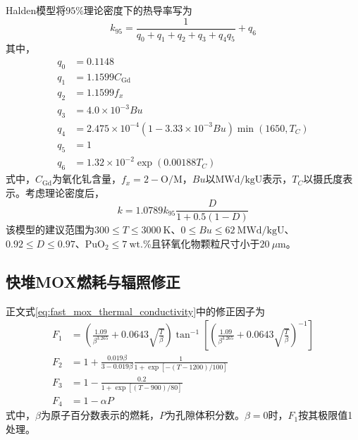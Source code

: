 Halden模型将$95\%$理论密度下的热导率写为
\begin{equation}
	k_{95}=
	\frac{1}{q_0+q_1+q_2+q_3+q_4q_5}+q_6
	\label{eq:appendix_halden_k95}
\end{equation}
其中，
\begin{equation}
	\begin{aligned}
		q_0&=0.1148\\
				q_1&=1.1599C_{\mathrm{Gd}}\\
				q_2&=1.1599f_x\\
				q_3&=4.0\times10^{-3}Bu\\
				q_4&=2.475\times10^{-4}
				\left(1-3.33\times10^{-3}Bu\right)
				\min(1650,T_C)\\
				q_5&=1\\
				q_6&=1.32\times10^{-2}\exp(0.00188T_C)
	\end{aligned}
	\label{eq:appendix_halden_terms}
\end{equation}
\label{eq:appendix_halden_q0}
\label{eq:appendix_halden_q1}
\label{eq:appendix_halden_q2}
\label{eq:appendix_halden_q3}
\label{eq:appendix_halden_q4}
\label{eq:appendix_halden_q5}
\label{eq:appendix_halden_q6}
式中，$C_{\mathrm{Gd}}$为氧化钆含量，$f_x=2-\mathrm{O/M}$，$Bu$以$\mathrm{MWd/kgU}$表示，$T_C$以摄氏度表示。考虑理论密度后，
\begin{equation}
	k=1.0789k_{95}\frac{D}{1+0.5(1-D)}
	\label{eq:appendix_halden_density_correction}
\end{equation}
该模型的建议范围为$300\leq T\leq3000\ \mathrm{K}$、$0\leq Bu\leq62\ \mathrm{MWd/kgU}$、$0.92\leq D\leq0.97$、$\mathrm{PuO}_2\leq7\ \mathrm{wt.\%}$且钚氧化物颗粒尺寸小于$20\ \mu\mathrm{m}$。

\subsection{快堆MOX燃耗与辐照修正}

正文式\eqref{eq:fast_mox_thermal_conductivity}中的修正因子为
\begin{equation}
	\begin{aligned}
		F_1&=
				\left(
				\frac{1.09}{\beta^{3.265}}
				+0.0643\sqrt{\frac{T}{\beta}}
				\right)
				\tan^{-1}\!\left[
				\left(
				\frac{1.09}{\beta^{3.265}}
				+0.0643\sqrt{\frac{T}{\beta}}
				\right)^{-1}
				\right]
				\\
				F_2&=1+
				\frac{0.019\beta}{3-0.019\beta}
				\frac{1}{1+\exp[-(T-1200)/100]}
				\\
				F_3&=1-
				\frac{0.2}{1+\exp[(T-900)/80]}
				\\
				F_4&=1-\alpha P
	\end{aligned}
	\label{eq:appendix_fast_mox_correction_factors}
\end{equation}
\label{eq:appendix_fast_mox_F1}
\label{eq:appendix_fast_mox_F2}
\label{eq:appendix_fast_mox_F3}
\label{eq:appendix_fast_mox_F4}
式中，$\beta$为原子百分数表示的燃耗，$P$为孔隙体积分数。$\beta=0$时，$F_1$按其极限值1处理。

